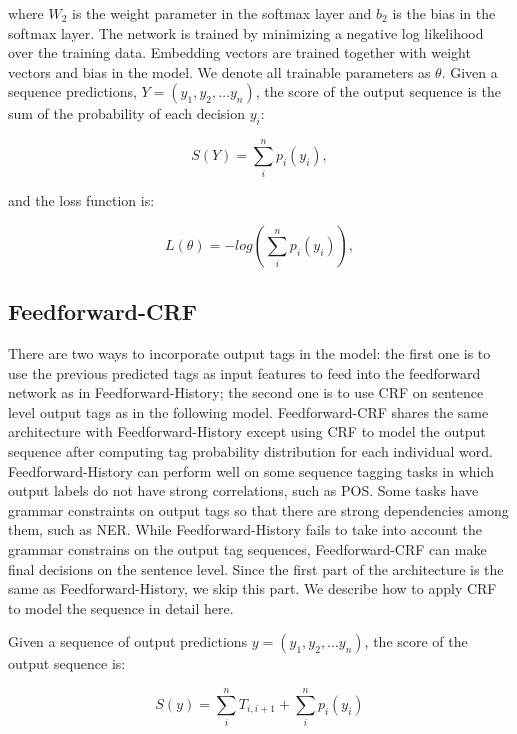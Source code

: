 where $W_{2}$ is the weight parameter in the softmax layer and $b_{2}$ is the bias in the softmax layer. The network is trained by minimizing a negative log likelihood over the training data. Embedding vectors are trained together with weight vectors and bias in the model. We denote all trainable parameters as $\theta$. Given a sequence predictions, $Y=\left( y_{1},y_{2},\ldots y_{n}\right)$,
the score of the output sequence is the sum of the probability of each decision $y_{i}$: 

\begin{equation}
S\left( Y\right) = \sum _{i}^{n}p_{i}\left(y_{i}\right),
\end{equation}

and the loss function is:

\begin{equation}
L\left(\theta\right) = -log\left(\sum _{i}^{n}p_{i}\left(y_{i}\right)\right),
\end{equation}


\subsection{Feedforward-CRF}
\label{Feedforward-CRF}
There are two ways to incorporate output tags in the model: the first one is to use the previous predicted tags as input features to feed into the feedforward network as in Feedforward-History; the second one is to use CRF on sentence level output tags as in the following model. Feedforward-CRF shares the same architecture with Feedforward-History except using CRF to model the output sequence after computing tag probability distribution for each individual word. Feedforward-History can perform well on some sequence tagging tasks in which output labels do not have strong correlations, such as POS. Some tasks have grammar constraints on output tags so that there are strong dependencies among them, such as NER. While Feedforward-History fails to take into account the grammar constrains on the output tag sequences, Feedforward-CRF can make final decisions on the sentence level. Since the first part of the architecture is the same as Feedforward-History, we skip this part. We describe how to apply CRF to model the sequence in detail here.

Given a sequence of output predictions $y=\left( y_{1},y_{2},\ldots y_{n}\right)$,
the score of the output sequence is:

\begin{equation}
S\left( y\right)=\sum _{i}^{n}T_{i,i+1}+\sum _{i}^{n}p_{i}\left(y_{i}\right)
\end{equation}

